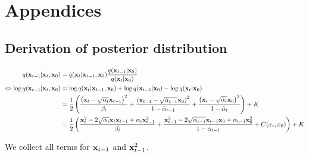 \chapter{Appendices}

\section{Derivation of posterior distribution} \label{appendix:q-posterior-derivation}
\begin{align*}
    q(\boldsymbol{\mathbf{x}}_{t-1} \vert \boldsymbol{\mathbf{x}}_t, \boldsymbol{\mathbf{x}}_0) &= q(\boldsymbol{\mathbf{x}}_t \vert \boldsymbol{\mathbf{x}}_{t-1}, \boldsymbol{\mathbf{x}}_0) \frac{q(\boldsymbol{\mathbf{x}}_{t-1} \vert \boldsymbol{\mathbf{x}}_0)}{q(\boldsymbol{\mathbf{x}}_t \vert \boldsymbol{\mathbf{x}}_0)} \\
    \Leftrightarrow \log q(\boldsymbol{\mathbf{x}}_{t-1} \vert \boldsymbol{\mathbf{x}}_t, \boldsymbol{\mathbf{x}}_0) &= \log q(\boldsymbol{\mathbf{x}}_t \vert \boldsymbol{\mathbf{x}}_{t-1}, \boldsymbol{\mathbf{x}}_0) + 
    \log q(\boldsymbol{\mathbf{x}}_{t-1} \vert \boldsymbol{\mathbf{x}}_0) - \log q(\boldsymbol{\mathbf{x}}_t \vert \boldsymbol{\mathbf{x}}_0) \\
    &= \frac{1}{2} \left( 
        \frac{\left( \boldsymbol{\mathbf{x}}_t - \sqrt{\alpha_t} \boldsymbol{\mathbf{x}}_{t-1} \right)^2}{\beta_t} +
        \frac{\left( \boldsymbol{\mathbf{x}}_{t-1} - \sqrt{\bar{\alpha}_{t-1}} \boldsymbol{\mathbf{x}}_0 \right)^2}{1 - \bar{\alpha}_{t-1}} + 
        \frac{\left( \boldsymbol{\mathbf{x}}_{t} - \sqrt{\bar{\alpha}_{t}} \boldsymbol{\mathbf{x}}_0 \right)^2}{1 - \bar{\alpha}_{t}}
    \right) + K \\
    &= \frac{1}{2} \left(
        \frac{\boldsymbol{\mathbf{x}}_t^2 - 2 \sqrt{\alpha_t}\boldsymbol{\mathbf{x}}_t \boldsymbol{\mathbf{x}}_{t-1} + \alpha_t \boldsymbol{\mathbf{x}}_{t-1}^2}{\beta_t} +
        \frac{\boldsymbol{\mathbf{x}}_{t-1}^2 - 2  \sqrt{\bar{\alpha}_{t-1}} \boldsymbol{\mathbf{x}}_{t-1} \boldsymbol{\mathbf{x}}_0 + \bar{\alpha}_{t-1}\boldsymbol{\mathbf{x}}_0^2  }{1 - \bar{\alpha}_{t-1}} + C(x_t, x_0)
    \right) + K
\end{align*}

We collect all terms for $\boldsymbol{\mathbf{x}}_{t-1}$ and $\boldsymbol{\mathbf{x}}_{t-1}^2$. 


